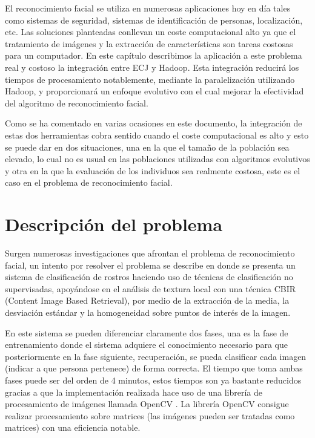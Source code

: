 \label{problema-facerecognition}

El reconocimiento facial se utiliza en numerosas aplicaciones hoy en día tales como sistemas de seguridad, sistemas de identificación de personas, localización, etc. Las soluciones planteadas conllevan un coste computacional alto ya que el tratamiento de imágenes y la extracción de características son tareas costosas para un computador. En este cap\'itulo describimos la aplicación a este problema real y costoso la integración entre ECJ y Hadoop. Esta integración reducir\'a los tiempos de procesamiento notablemente, mediante la paralelizaci\'on utilizando Hadoop, y proporcionar\'a un enfoque evolutivo con el cual mejorar la efectividad del algoritmo de reconocimiento facial.

Como se ha comentado en varias ocasiones en este documento, la integración de estas dos herramientas cobra sentido cuando el coste computacional es alto y esto se puede dar en dos situaciones, una en la que el tama\~no de la población sea elevado, lo cual no es usual en las poblaciones utilizadas con algoritmos evolutivos y otra en la que la evaluación de los individuos sea realmente costosa, este es el caso en el problema de reconocimiento facial.

\section{Descripci\'on del problema}

Surgen numerosas investigaciones que afrontan el problema de reconocimiento facial, un intento por resolver el problema se describe en \cite{paper-facerecognition} donde se presenta un sistema de clasificación de rostros haciendo uso de técnicas de clasificaci\'on no supervisadas, apoy\'andose en el an\'alisis de textura local con una t\'ecnica CBIR (Content Image Based Retrieval), por medio de la extracci\'on de la media, la desviaci\'on est\'andar y la homogeneidad sobre puntos de inter\'es de la imagen.

En este sistema se pueden diferenciar claramente dos fases, una es la fase de entrenamiento donde el sistema adquiere el conocimiento necesario para que posteriormente en la fase siguiente, recuperación, se pueda clasificar cada imagen (indicar a que persona pertenece) de forma correcta. El tiempo que toma ambas fases puede ser del orden de 4 minutos, estos tiempos son ya bastante reducidos gracias a que la implementaci\'on realizada hace uso de una librería de procesamiento de im\'agenes llamada OpenCV \cite{opencv}. La librería OpenCV consigue realizar procesamiento sobre matrices (las imágenes pueden ser tratadas como matrices) con una eficiencia notable.

